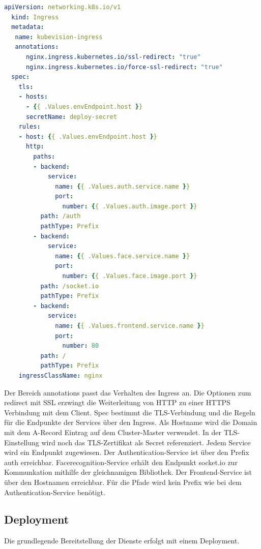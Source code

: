\begin{lstlisting}[caption={kubevision-ingress.yaml},captionpos=b,label={lst:kubevisioningress},language=yaml]
  apiVersion: networking.k8s.io/v1
  kind: Ingress
  metadata:
   name: kubevision-ingress
   annotations:
      nginx.ingress.kubernetes.io/ssl-redirect: "true"
      nginx.ingress.kubernetes.io/force-ssl-redirect: "true"
  spec:
    tls:
    - hosts:
      - {{ .Values.envEndpoint.host }}
      secretName: deploy-secret
    rules:
    - host: {{ .Values.envEndpoint.host }}
      http:
        paths:
        - backend:
            service:
              name: {{ .Values.auth.service.name }}
              port:
                number: {{ .Values.auth.image.port }}
          path: /auth
          pathType: Prefix
        - backend:
            service:
              name: {{ .Values.face.service.name }}
              port:
                number: {{ .Values.face.image.port }}
          path: /socket.io
          pathType: Prefix
        - backend:
            service:
              name: {{ .Values.frontend.service.name }}
              port:
                number: 80
          path: /
          pathType: Prefix
    ingressClassName: nginx

\end{lstlisting}

Der Bereich annotations passt das Verhalten des Ingress an.
Die Optionen zum redirect mit SSL erzwingt die Weiterleitung von HTTP zu einer HTTPS Verbindung mit dem Client.
Spec bestimmt die TLS-Verbindung und die Regeln für die Endpunkte der Services über den Ingress.
Als Hostname wird die Domain mit dem A-Record Eintrag auf dem Cluster-Master verwendet.
In der TLS-Einstellung wird noch das TLS-Zertifikat als Secret referenziert.
Jedem Service wird ein Endpunkt zugewiesen.
Der Authentication-Service ist über den Prefix auth erreichbar.
Facerecognition-Service erhält den Endpunkt socket.io zur Kommunkation mithilfe der gleichnamigen Bibliothek.
Der Frontend-Service ist über den Hostnamen erreichbar.
Für die Pfade wird kein Prefix wie bei dem Authentication-Service benötigt.



\subsection{Deployment}

Die grundlegende Bereitstellung der Dienste erfolgt mit einem Deployment.

